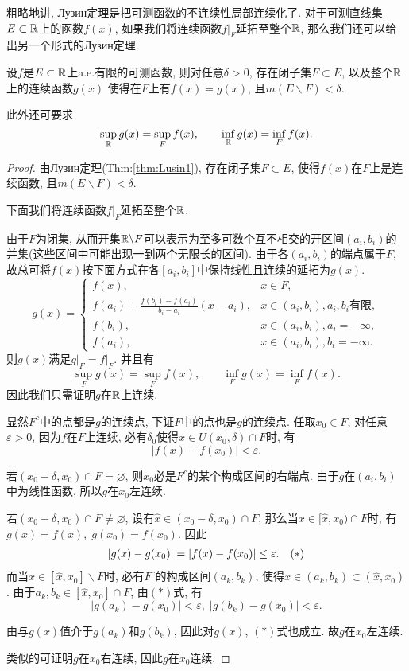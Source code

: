 \vskip 0.3cm
粗略地讲, Лузин定理是把可测函数的不连续性局部连续化了. 
对于可测直线集$E\subset \mathbb{R}$上的函数$f(x)$, 
如果我们将连续函数$\left. f \right|_F$延拓至整个$\mathbb{R}$, 
那么我们还可以给出另一个形式的Лузин定理. 
\vskip 0.3cm

\begin{theorem}[Лузин定理']\label{thm:Lusin2}
	设$f$是$E\subset \mathbb{R}$上a.e.有限的可测函数, 则对任意$\delta > 0$, 
	存在闭子集$F \subset E$, 以及整个$\mathbb{R}$上的连续函数$g(x)$
	使得在$F$上有$f(x) = g(x)$, 
	且$m(E\backslash F) < \delta$.
	
	此外还可要求
	$$
		\sup_{\mathbb{R}} g(x) = \sup_{F} f(x), \qquad 
		\inf_{\mathbb{R}} g(x) = \inf_{F} f(x). 
	$$
\end{theorem}
\begin{proof}
	由Лузин定理(Thm:\ref{thm:Lusin1}), 存在闭子集$F \subset E$, 使得$f(x)$在$F$上是连续函数, 且$m(E\backslash F) < \delta$.
	
	下面我们将连续函数$\left. f \right|_F$延拓至整个$\mathbb{R}$. 
	
	由于$F$为闭集, 从而开集$\mathbb{R} \backslash F$可以表示为至多可数个互不相交的开区间$(a_i,b_i)$的并集(这些区间中可能出现一到两个无限长的区间). 
	由于各$(a_i,b_i)$的端点属于$F$, 故总可将$f(x)$按下面方式在各$[a_i,b_i]$中保持线性且连续的延拓为$g(x)$. 
	$$
		g(x) = 
		\begin{cases}
			f(x), & x \in F, \\
			f(a_i) + \frac{f(b_i) - f(a_i)}{b_i - a_i}(x - a_i), & x \in (a_i,b_i), a_i, b_i \text{有限}, \\
			f(b_i), & x \in (a_i,b_i), a_i = - \infty, \\
			f(a_i), & x \in (a_i,b_i), b_i = - \infty.
		\end{cases}
	$$
	则$g(x)$满足$\left. g \right|_F = \left. f \right|_F$. 
	并且有
	$$
		\sup_{F} g(x) = \sup_{F} f(x), \qquad 
		\inf_{F} g(x) = \inf_{F} f(x). 
	$$
	因此我们只需证明$g$在$\mathbb{R}$上连续. 
	
	显然$F^c$中的点都是$g$的连续点, 下证$F$中的点也是$g$的连续点. 
	任取$x_0 \in F$, 对任意$\varepsilon > 0$, 因为$f$在$F$上连续, 必有$\delta_0$使得$x \in U(x_0, \delta) \cap F$时, 有
	$$
		|f(x) - f(x_0)| < \varepsilon.
	$$
	
	若$(x_0 - \delta, x_0) \cap F = \varnothing$, 则$x_0$必是$F^c$的某个构成区间的右端点. 由于$g$在$(a_i,b_i)$中为线性函数, 所以$g$在$x_0$左连续. 
	
	若$(x_0 - \delta, x_0) \cap F \neq \varnothing$, 设有$\hat{x} \in (x_0 - \delta, x_0) \cap F$, 那么当$x \in [\hat{x}, x_0) \cap F$时, 有$g(x) = f(x),\; g(x_0) = f(x_0)$. 因此
	$$
	\begin{array}{c r}
		|g(x) - g(x_0)| = |f(x) - f(x_0)| \leq \varepsilon. & (*)
	\end{array}
	$$
	而当$x \in [\hat{x}, x_0] \backslash F$时, 必有$F^c$的构成区间$(a_k, b_k)$, 使得$x \in (a_k, b_k) \subset (\hat{x}, x_0)$. 
	由于$a_k, b_k \in [\hat{x}, x_0] \cap F$, 由$(*)$式, 有
	$$
		|g(a_k) - g(x_0)| < \varepsilon, \;
		|g(b_k) - g(x_0)| < \varepsilon.
	$$
	
	由与$g(x)$值介于$g(a_k)$和$g(b_k)$, 因此对$g(x)$, $(*)$式也成立. 故$g$在$x_0$左连续.
	
	类似的可证明$g$在$x_0$右连续, 因此$g$在$x_0$连续. 
\end{proof}

